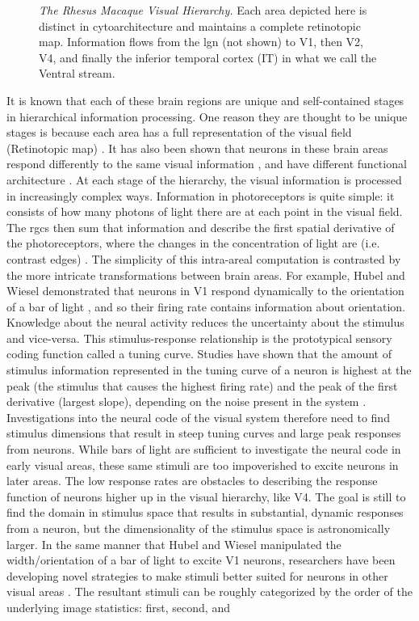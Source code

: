 \begin{figure}[h]
	\caption{\textit{The Rhesus Macaque Visual Hierarchy.} Each area depicted here is distinct in cytoarchitecture and maintains a complete retinotopic map. Information flows from the \gls{lgn} (not shown) to V1, then V2, V4, and finally the inferior temporal cortex (IT) in what we call the Ventral stream. }
	\label{fig:brain}
\end{figure}

It is known that each of these brain regions are unique and self-contained stages in hierarchical information processing. One reason they are thought to be unique stages is because each area has a full representation of the visual field (Retinotopic map) \citep{Felleman1997}. It has also been shown that neurons in these brain areas respond differently to the same visual information \citep{Mahon2001}, and have different functional architecture \citep{Yoshioka1996, Hubel1965}. At each stage of the hierarchy, the visual information is processed in increasingly complex ways. Information in photoreceptors is quite simple: it consists of how many photons of light there are at each point in the visual field. The \gls{rgcs} then sum that information and describe the first spatial derivative of the photoreceptors, where the changes in the concentration of light are (i.e. contrast edges) \cite{Wiesel1959}. The simplicity of this intra-areal computation is contrasted by the more intricate transformations between brain areas. For example, Hubel and Wiesel demonstrated that neurons in V1 respond dynamically to the orientation of a bar of light \cite{Hubel1959}, and so their firing rate contains information about orientation. Knowledge about the neural activity reduces the uncertainty about the stimulus and vice-versa. This stimulus-response relationship is the prototypical sensory coding function called a tuning curve. Studies have shown that the amount of stimulus information represented in the tuning curve of a neuron is highest at the peak (the stimulus that causes the highest firing rate) and the peak of the first derivative (largest slope), depending on the noise present in the system \cite{Butts2006}. Investigations into the neural code of the visual system therefore need to find stimulus dimensions that result in steep tuning curves and large peak responses from neurons. While bars of light are sufficient to investigate the neural code in early visual areas, these same stimuli are too impoverished to excite neurons in later areas. The low response rates are obstacles to describing the response function of neurons higher up in the visual hierarchy, like V4. The goal is still to find the domain in stimulus space that results in substantial, dynamic responses from a neuron, but the dimensionality of the stimulus space is astronomically larger. In the same manner that Hubel and Wiesel manipulated the width/orientation of a bar of light to excite V1 neurons, researchers have been developing novel strategies to make stimuli better suited for neurons in other visual areas \cite{Hubel1959, Pasupathy2002, Ponce2019, Cowley2017}. The resultant stimuli can be roughly categorized by the order of the underlying image statistics: first, second, and 
